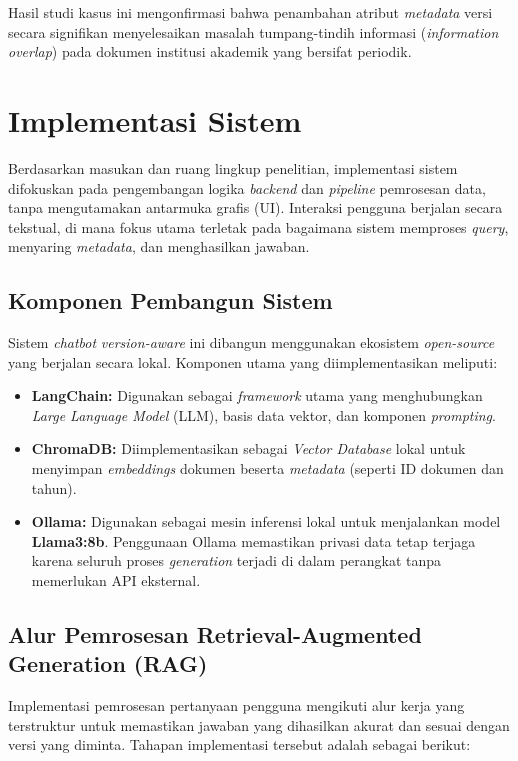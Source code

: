 Hasil studi kasus ini mengonfirmasi bahwa penambahan atribut \textit{metadata} versi secara signifikan menyelesaikan masalah tumpang-tindih informasi (\textit{information overlap}) pada dokumen institusi akademik yang bersifat periodik.

\section{Implementasi Sistem}
\label{sec:implementasi}

Berdasarkan masukan dan ruang lingkup penelitian, implementasi sistem difokuskan pada pengembangan logika \textit{backend} dan \textit{pipeline} pemrosesan data, tanpa mengutamakan antarmuka grafis (UI). Interaksi pengguna berjalan secara tekstual, di mana fokus utama terletak pada bagaimana sistem memproses \textit{query}, menyaring \textit{metadata}, dan menghasilkan jawaban.

\subsection{Komponen Pembangun Sistem}

Sistem \textit{chatbot} \textit{version-aware} ini dibangun menggunakan ekosistem \textit{open-source} yang berjalan secara lokal. Komponen utama yang diimplementasikan meliputi:
\begin{itemize}
    \item \textbf{LangChain:} Digunakan sebagai \textit{framework} utama yang menghubungkan \textit{Large Language Model} (LLM), basis data vektor, dan komponen \textit{prompting}.
    \item \textbf{ChromaDB:} Diimplementasikan sebagai \textit{Vector Database} lokal untuk menyimpan \textit{embeddings} dokumen beserta \textit{metadata} (seperti ID dokumen dan tahun).
    \item \textbf{Ollama:} Digunakan sebagai mesin inferensi lokal untuk menjalankan model \textbf{Llama3:8b}. Penggunaan Ollama memastikan privasi data tetap terjaga karena seluruh proses \textit{generation} terjadi di dalam perangkat tanpa memerlukan API eksternal.
\end{itemize}

\newpage
\subsection{Alur Pemrosesan Retrieval-Augmented Generation (RAG)}

Implementasi pemrosesan pertanyaan pengguna mengikuti alur kerja yang terstruktur untuk memastikan jawaban yang dihasilkan akurat dan sesuai dengan versi yang diminta. Tahapan implementasi tersebut adalah sebagai berikut:

